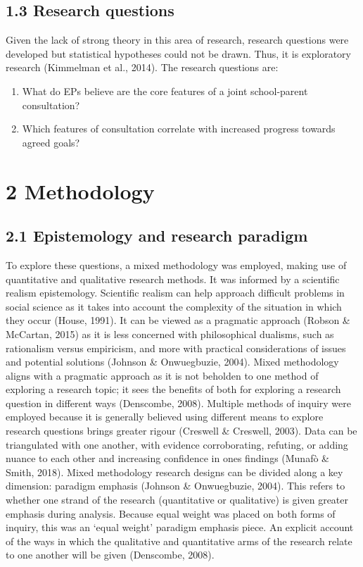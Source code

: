 \documentclass[
  english,
  man]{apa}
\begin{document}
\hypertarget{research-questions}{%
\subsection{1.3 Research questions}\label{research-questions}}

Given the lack of strong theory in this area of research, research questions were developed but statistical hypotheses could not be drawn. Thus, it is exploratory research (Kimmelman et al., 2014). The research questions are:

\begin{enumerate}
\def\labelenumi{\arabic{enumi}.}
\item
  What do EPs believe are the core features of a joint school-parent
  consultation?
\item
  Which features of consultation correlate with increased progress
  towards agreed goals?
\end{enumerate}

\hypertarget{methodology}{%
\section{2 Methodology}\label{methodology}}

\hypertarget{epistemology-and-research-paradigm}{%
\subsection{2.1 Epistemology and research paradigm}\label{epistemology-and-research-paradigm}}

To explore these questions, a mixed methodology was employed, making use of quantitative and qualitative research methods. It was informed by a scientific realism epistemology. Scientific realism can help approach difficult problems in social science as it takes into account the complexity of the situation in which they occur (House, 1991). It can be viewed as a pragmatic approach (Robson \& McCartan, 2015) as it is less concerned with philosophical dualisms, such as rationalism versus empiricism, and more with practical considerations of issues and potential solutions (Johnson \& Onwuegbuzie, 2004). Mixed methodology aligns with a pragmatic approach as it is not beholden to one method of exploring a research topic; it sees the benefits of both for exploring a research question in different ways (Denscombe, 2008). Multiple methods of inquiry were employed because it is generally believed using different means to explore research questions brings greater rigour (Creswell \& Creswell, 2003). Data can be triangulated with one another, with evidence corroborating, refuting, or adding nuance to each other and increasing confidence in ones findings (Munafò \& Smith, 2018). Mixed methodology research designs can be divided along a key dimension: paradigm emphasis (Johnson \& Onwuegbuzie, 2004). This refers to whether one strand of the research (quantitative or qualitative) is given greater emphasis during analysis. Because equal weight was placed on both forms of inquiry, this was an `equal weight' paradigm emphasis piece. An explicit account of the ways in which the qualitative and quantitative arms of the research relate to one another will be given (Denscombe, 2008).
\end{document}
